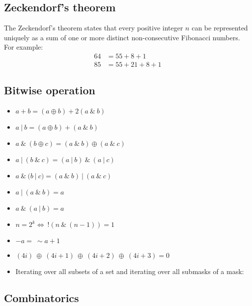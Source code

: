 \subsection{Zeckendorf’s theorem}
The Zeckendorf's theorem states that every positive integer $n$ can be represented uniquely as a sum of one or more 
distinct non-consecutive Fibonacci numbers. For example:
	\vspace{-0.45cm}
	\begin{align*}
		64 &= 55 + 8 + 1 \\ 
		85 &= 55 + 21 + 8 + 1
	\end{align*}
	\vspace{-0.45cm}

\subsection{Bitwise operation}
\begin{multicols}{2}
\vspace{-\topsep}
\begin{itemize}
  	\setlength{\parskip}{0pt}
 	\setlength{\itemsep}{0pt plus 1pt}
	\item $a + b = (a \oplus b) + 2(a\ \&\ b)$
	\item $a\ |\ b = (a \oplus b) + (a\ \&\ b)$
	\item $a\ \&\ (b \oplus c) = (a\ \&\ b) \oplus (a\ \&\ c)$
	\item $a\ |\ (b\ \&\ c) = (a\ |\ b)\ \&\ (a\ |\ c)$
	\item $a\ \&\ (b\ |\ c) = (a\ \&\ b)\ |\ (a\ \&\ c)$
  	\item $a\ |\ (a\ \&\ b) = a$
	\item $a\ \&\ (a\ |\ b) = a$
	\item $n = 2 ^ k \Leftrightarrow\ !(n\ \&\ (n - 1)) = 1$
	\item $-a =\ \sim a + 1$
	\item $(4i)\ \oplus\ (4i + 1)\ \oplus\ (4i + 2)\ \oplus\ (4i + 3) = 0$
\end{itemize}
\vspace{-\topsep}
\end{multicols}
\begin{itemize}
	\item Iterating over all subsets of a set and iterating over all submasks of a mask:
\end{itemize}

\subsection{Combinatorics}
